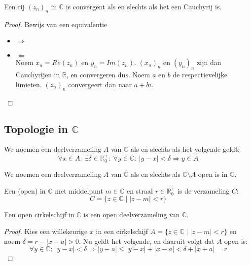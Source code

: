 \documentclass[main.tex]{subfiles}
\begin{document}
\begin{st}
  Een rij $(z_{n})_{n}$ in $\mathbb{C}$ is convergent als en slechts als het een Cauchyrij is.

  \begin{proof}
    Bewijs van een equivalentie\\
    \begin{itemize}
    \item $\Rightarrow$\\
    \item $\Leftarrow$\\
      Noem $x_{n} = Re(z_{n})$ en $y_{n} = Im(z_{n})$.
      $(x_{n})_{n}$ en $(y_{n})_{n}$ zijn dan Cauchyrijen in $\mathbb{R}$, en convergeren dus.
      Noem $a$ en $b$ de respectievelijke limieten.
      $(z_{n})_{n}$ convergeert dan naar $a+bi$.
    \end{itemize}
  \end{proof}
\end{st}


\subsection{Topologie in $\mathbb{C}$}
\label{sec:topologie-mathbbc}

\begin{de}
  We noemen een deelverzameling $A$ van $\mathbb{C}$  als en slechts als het volgende geldt:
  \[ \forall x\in A:\ \exists \delta \in \mathbb{R}_{0}^{+}:\ \forall y\in \mathbb{C}:\ |y-x| < \delta \Rightarrow y \in A \]
\end{de}

\begin{de}
  We noemen een deelverzameling $A$ van $\mathbb{C}$  als en slechts als $\mathbb{C} \setminus A$ open is in $\mathbb{C}$.
\end{de}

\begin{de}
  Een (open)  in $\mathbb{C}$ met middelpunt $m\in \mathbb{C}$ en straal $r\in \mathbb{R}_{0}^{+}$ is de verzameling $C$:
  \[ C = \{ z \in \mathbb{C} \mid |z-m| < r \} \]
\end{de}

\begin{st}
  Een open cirkelschijf in $\mathbb{C}$ is een open deelverzameling van $\mathbb{C}$.

  \begin{proof}
    Kies een willekeurige $x$ in een cirkelschijf $A = \{ z \in \mathbb{C} \mid |z-m| < r \}$ en noem $\delta = r-|x-a| > 0$.
    Nu geldt het volgende, en daaruit volgt dat $A$ open is:
    \[ \forall y\in \mathbb{C}:\ |y-x|<\delta \Rightarrow |y-a| \le |y-x|+|x-a| < \delta + |x+a| = r \]
  \end{proof}
\end{st}
\end{document}
